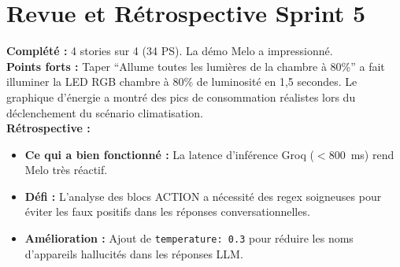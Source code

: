\section{Revue et Rétrospective Sprint 5}

\begin{tcolorbox}[goalbox,title={Revue Sprint 5}]
\textbf{Complété :} 4 stories sur 4 (34 PS). La démo Melo a impressionné. \\
\textbf{Points forts :} Taper ``Allume toutes les lumières de la chambre à 80\%'' a fait
illuminer la LED RGB chambre à 80\% de luminosité en 1,5 secondes. Le graphique d'énergie
a montré des pics de consommation réalistes lors du déclenchement du scénario climatisation. \\
\textbf{Rétrospective :}
\begin{itemize}[leftmargin=1cm,itemsep=2pt]
  \item \textbf{Ce qui a bien fonctionné :} La latence d'inférence Groq ($<$800~ms) rend
        Melo très réactif.
  \item \textbf{Défi :} L'analyse des blocs ACTION a nécessité des regex soigneuses pour
        éviter les faux positifs dans les réponses conversationnelles.
  \item \textbf{Amélioration :} Ajout de \texttt{temperature: 0.3} pour réduire les noms
        d'appareils hallucités dans les réponses LLM.
\end{itemize}
\end{tcolorbox}
